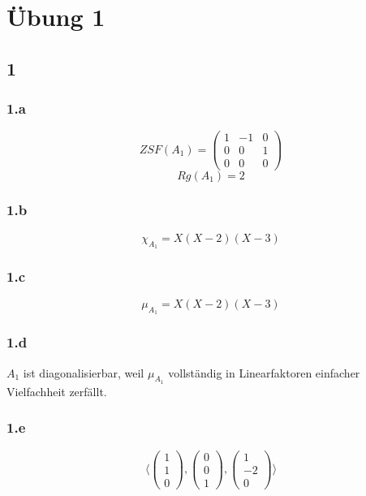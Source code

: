 \documentclass[10pt,a4paper]{article}
\begin{document}
\section*{Übung 1}

\subsection*{1}

\subsubsection*{1.a}

\begin{equation}
ZSF(A_{1}) = 
\begin{pmatrix}
1 & -1 & 0\\
0 & 0 & 1\\
0 & 0 & 0
\end{pmatrix}
\end{equation}
\begin{equation}
Rg(A_{1}) = 2
\end{equation}

\subsubsection*{1.b}

\begin{equation}
\chi_{A_{1}} = X(X-2)(X-3)
\end{equation}

\subsubsection*{1.c}

\begin{equation}
\mu_{A_{1}} = X(X-2)(X-3)
\end{equation}

\subsubsection*{1.d}

$A_{1}$ ist diagonalisierbar, weil $\mu_{A_{1}}$ vollständig in Linearfaktoren einfacher Vielfachheit zerfällt.

\subsubsection*{1.e}

\begin{equation}
\langle
\begin{pmatrix}
1\\1\\0
\end{pmatrix},
\begin{pmatrix}
0\\0\\1
\end{pmatrix},
\begin{pmatrix}
1\\-2\\0
\end{pmatrix}
\rangle
\end{equation}
\end{document}
